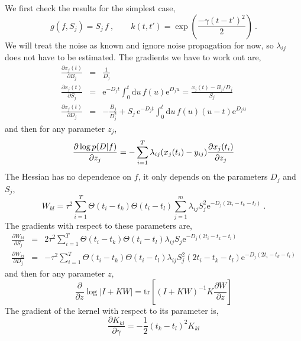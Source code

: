 \documentclass[10pt]{article}
\begin{document}
We first check the results for the simplest case,
\begin{equation}
g(f,S_j) = S_j \, f \ , \qquad k(t,t')  =
\exp\left(\frac{-\gamma(t-t')^2}{2} \right) \ .
\end{equation}
We will treat the noise as known and ignore noise propagation for
now, so $\lambda_{ij}$ does not have to be estimated. The gradients we have to work out are,
\begin{eqnarray*}
\frac{\partial x_j(t)}{\partial B_j} & = & \frac{1}{D_j} \\
\frac{\partial x_j(t)}{\partial S_j} & = & \mathrm{e}^{-D_j t}\int_{0}^t \mathrm{d}u 
\, f(u) \mathrm{e}^{D_j u} = \frac{x_j(t)-B_j/D_j}{S_j} \\
\frac{\partial x_j(t)}{\partial D_j} & = & -\frac{B_j}{D_j^2} + S_j \, \mathrm{e}^{-D_j t}\int_{0}^t \mathrm{d}u 
\, f(u)(u - t)\mathrm{e}^{D_j u}
\end{eqnarray*}
and then for any parameter $z_j$,
\begin{equation}
\frac{\partial \log p(D|f)}{\partial z_j} = -\sum_{i=1}^T \lambda_{ij} 
(x_j(t_i) - y_{ij})\frac{\partial x_j(t_i)}{\partial z_j} \\
\end{equation}
The Hessian has no dependence on $f$, it only depends on the
parameters $D_j$ and $S_j$,
\begin{equation}
W_{kl} = \tau^2\sum_{i=1}^T \Theta(t_i-t_k)\Theta(t_i-t_l)\sum_{j=1}^m \lambda_{ij} S_j^2
\mathrm{e}^{-D_j(2t_i-t_k-t_l)}\ .
\end{equation}
The gradients with respect to these parameters are,
\begin{eqnarray*}
\frac{\partial W_{kl}}{\partial S_j} & = & 2\tau^2\sum_{i=1}^T \Theta(t_i-t_k)\Theta(t_i-t_l)\lambda_{ij} S_j
\mathrm{e}^{-D_j(2t_i-t_k-t_l)} \\
\frac{\partial W_{kl}}{\partial D_j} & = & -\tau^2\sum_{i=1}^T \Theta(t_i-t_k)\Theta(t_i-t_l)\lambda_{ij} S_j^2
(2t_i-t_k-t_l) \mathrm{e}^{-D_j(2t_i-t_k-t_l)} 
\end{eqnarray*}
and then for any parameter $z$,
\begin{equation}
\frac{\partial}{\partial z}\log|I+KW|  = \mbox{tr}\left[
  (I+KW)^{-1}K\frac{\partial W}{\partial z}\right]
\end{equation}
The gradient of the kernel with respect to its parameter is,
\begin{equation}
\frac{\partial K_{kl}}{\partial \gamma} = -\mbox{$\frac{1}{2}$}(t_k-t_l)^2K_{kl}
\end{equation}
\end{document}
